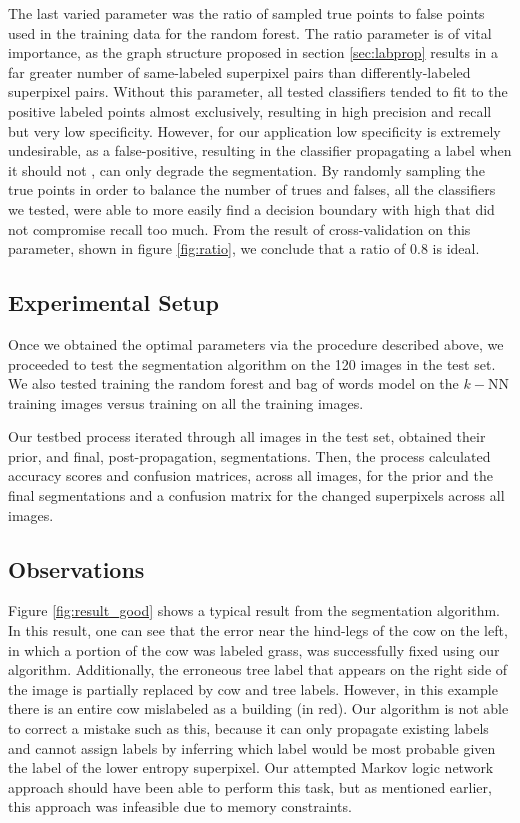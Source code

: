 \documentclass{article} %
\begin{document}
The last varied parameter was the ratio of sampled true points to false points used in the training data for the random forest.
The ratio parameter is of vital importance, as the graph structure proposed in section \ref{sec:labprop} results in a far greater number of same-labeled superpixel pairs than differently-labeled superpixel pairs.
Without this parameter, all tested classifiers tended to fit to the positive labeled points almost exclusively, resulting in high precision and recall but very low specificity. 
However, for our application low specificity is extremely undesirable, as a false-positive, resulting in the classifier propagating a label when it should not , can only degrade the segmentation. By randomly sampling the true points in order to balance the number of trues and falses, all the classifiers we tested, were able to more easily find a decision boundary with high that did not compromise recall too much.  
From the result of cross-validation on this parameter, shown in figure \ref{fig:ratio}, we conclude that a ratio of 0.8 is ideal.


\subsection{Experimental Setup}

Once we obtained the optimal parameters via the procedure described above, we proceeded to test the segmentation algorithm on the 120 images in the test set. We also tested training the random forest and bag of words model on the $k-$NN training images versus training on all the training images.

Our testbed process iterated through all images in the test set, obtained their prior, and final, post-propagation, segmentations. Then, the process calculated accuracy scores and confusion matrices, across all images, for the prior and the final segmentations and a confusion matrix for the changed superpixels across all images. 

\subsection{Observations}
\label{sec:Observations}

Figure \ref{fig:result_good} shows a typical result from the segmentation algorithm. In this result, one can see that the error near the hind-legs of the cow on the left, in which a portion of the cow was labeled grass, was successfully fixed using our algorithm. Additionally, the erroneous tree label that appears on the right side of the image is partially replaced by cow and tree labels. However, in this example there is an entire cow mislabeled as a building (in red). Our algorithm is not able to correct a mistake such as this, because it can only propagate existing labels and cannot assign labels by inferring which label would be most probable given the label of the lower entropy superpixel. Our attempted Markov logic network approach should have been able to perform this task, but as mentioned earlier, this approach was infeasible due to memory constraints.
\end{document}
